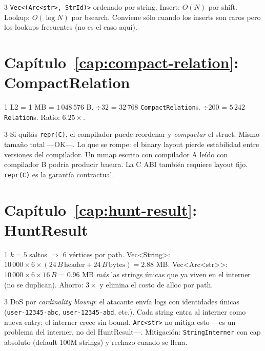 \begin{solucion}{3}
\texttt{Vec<(Arc<str>, StrId)>} ordenado por string. Insert:
\(O(N)\) por shift. Lookup: \(O(\log N)\) por bsearch. Conviene
sólo cuando los inserts son raros pero los lookups frecuentes
(no es el caso aquí).
\end{solucion}

\section*{Capítulo~\ref{cap:compact-relation}: CompactRelation}

\begin{solucion}{1}
L2 = 1 MB = \(1\,048\,576\) B. \(\div 32\) = \(32\,768\)
\texttt{CompactRelation}s. \(\div 200\) = \(5\,242\) \texttt{Relation}s.
Ratio: \(6.25\times\).
\end{solucion}

\begin{solucion}{3}
Si quitás \texttt{repr(C)}, el compilador puede reordenar y
\emph{compactar} el struct. Mismo tamaño total ---OK---. Lo que
se rompe: el binary layout pierde estabilidad entre versiones
del compilador. Un mmap escrito con compilador A leído con
compilador B podría producir basura. La C ABI también requiere
layout fijo. \texttt{repr(C)} es la garantía contractual.
\end{solucion}

\section*{Capítulo~\ref{cap:hunt-result}: HuntResult}

\begin{solucion}{1}
\(k = 5\) saltos $\Rightarrow$ 6 vértices por path.
Vec<String>: \(10\,000 \times 6 \times (24\,B\,\text{header} +
24\,B\,\text{bytes}) = 2.88\) MB. Vec<Arc<str>>:
\(10\,000 \times 6 \times 16\,B\) = 0.96 MB \emph{más} las strings
únicas que ya viven en el interner (no se duplican). Ahorro:
\(3\times\) y elimina el costo de alloc por path.
\end{solucion}

\begin{solucion}{3}
DoS por \emph{cardinality blowup}: el atacante envía logs con
identidades únicas (\texttt{user-12345-abc}, \texttt{user-12345-abd},
etc.). Cada string entra al interner como nueva entry; el interner
crece sin bound. \texttt{Arc<str>} no mitiga esto ---es un
problema del interner, no del HuntResult---. Mitigación:
\texttt{StringInterner} con cap absoluto (default 100M strings) y
rechazo cuando se llena.
\end{solucion}

